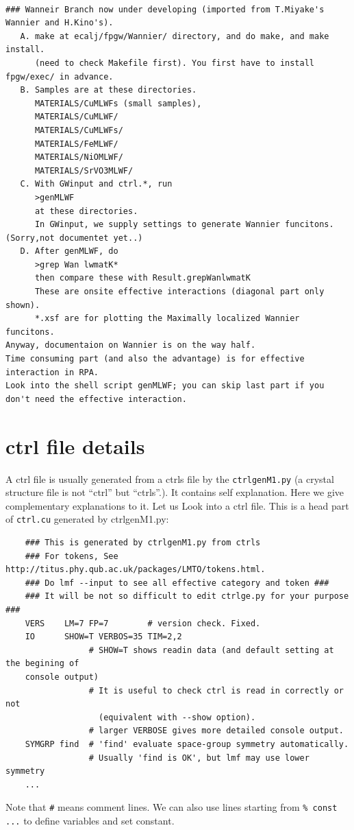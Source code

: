 {\begin{verbatim}

### Wanneir Branch now under developing (imported from T.Miyake's Wannier and H.Kino's).
   A. make at ecalj/fpgw/Wannier/ directory, and do make, and make install. 
      (need to check Makefile first). You first have to install fpgw/exec/ in advance.
   B. Samples are at these directories. 
      MATERIALS/CuMLWFs (small samples),
      MATERIALS/CuMLWF/
      MATERIALS/CuMLWFs/
      MATERIALS/FeMLWF/      
      MATERIALS/NiOMLWF/
      MATERIALS/SrVO3MLWF/
   C. With GWinput and ctrl.*, run 
      >genMLWF
      at these directories.
      In GWinput, we supply settings to generate Wannier funcitons. (Sorry,not documentet yet..)
   D. After genMLWF, do
      >grep Wan lwmatK*
      then compare these with Result.grepWanlwmatK
      These are onsite effective interactions (diagonal part only shown).
      *.xsf are for plotting the Maximally localized Wannier funcitons.
Anyway, documentaion on Wannier is on the way half.
Time consuming part (and also the advantage) is for effective interaction in RPA.
Look into the shell script genMLWF; you can skip last part if you don't need the effective interaction.

\end{verbatim}


\section{ctrl file details}
A ctrl file is usually generated from a ctrls file by the \verb+ctrlgenM1.py+
(a crystal structure file is not ``ctrl'' but ``ctrls''.).
It contains self explanation.
Here we give complementary explanations to it.
Let us Look into a ctrl file. This is a head part of \verb+ctrl.cu+ generated by ctrlgenM1.py:
\begin{verbatim}
    ### This is generated by ctrlgenM1.py from ctrls 
    ### For tokens, See http://titus.phy.qub.ac.uk/packages/LMTO/tokens.html. 
    ### Do lmf --input to see all effective category and token ###
    ### It will be not so difficult to edit ctrlge.py for your purpose ###
    VERS    LM=7 FP=7        # version check. Fixed.
    IO      SHOW=T VERBOS=35 TIM=2,2
                 # SHOW=T shows readin data (and default setting at the begining of 
    console output)
                 # It is useful to check ctrl is read in correctly or not
                   (equivalent with --show option).
                 # larger VERBOSE gives more detailed console output.
    SYMGRP find  # 'find' evaluate space-group symmetry automatically.
                 # Usually 'find is OK', but lmf may use lower symmetry
    ...
\end{verbatim}
Note that \verb+#+ means comment lines. We can also use
lines starting from \verb+% const ...+ to define variables and set constant.

}
